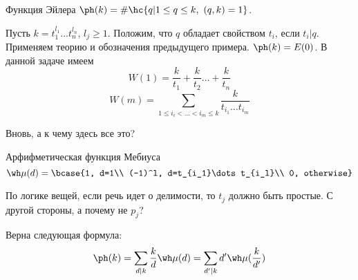 \documentclass[unicode,10pt]{article}
\begin{document}
\begin{ex}
  \begin{df}
    Функция Эйлера $\ph(k) =\#\hc{q|1\le q\le k,\ (q,k) = 1}$.
  \end{df}
  Пусть $k=t_1^{l_1}\dots t_n^{l_n}$, $l_j\ge 1$. Положим, что $q$ обладает свойством $t_i$, если $t_i|q$.
  Применяем теорию и обозначения предыдущего примера. $\ph(k)=E(0)$. В данной задаче имеем
  \begin{displaymath}
    W(1) = \frac{k}{t_1}+\frac{k}{t_2}\dots +\frac{k}{t_n}
  \end{displaymath}
  \begin{displaymath}
    W(m)=\sum_{1\le i_i<\dots <i_m\le k}\frac{k}{t_{i_1}\dots t_{i_m}}
  \end{displaymath}
  \begin{authornote}
    Вновь, а к чему здесь все это?
  \end{authornote}
  \begin{df}
    Арфифметическая функция Мебиуса
    \begin{displaymath}
      \wh \mu(d)=\bcase{1, d=1\\ (-1)^l, d=t_{i_1}\dots t_{i_l}\\ 0, otherwise}
    \end{displaymath}
    \begin{authornote}
      По логике вещей, если речь идет о делимости, то $t_j$ должно быть простые. С другой стороны,
      а почему не $p_j$?
    \end{authornote}
  \end{df}
  Верна следующая формула\WHY:
  \begin{displaymath}
    \displaystyle \ph(k)=\sum_{d|k}\frac{k}{d}\wh\mu(d)=\sum_{d'|k}d'\wh\mu(\frac{k}{d'})
  \end{displaymath}


\end{ex}
\end{document}
